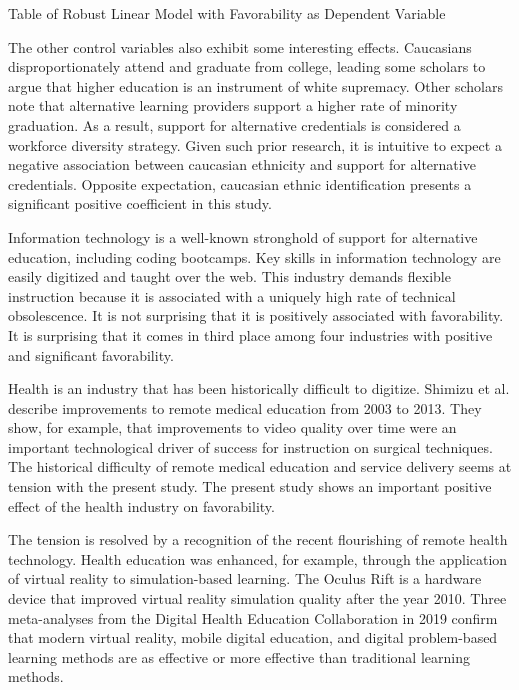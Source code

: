 \begin{table}
    \caption{Table of Robust Linear Model with Favorability as Dependent Variable}
    \resizebox{\columnwidth}{!}{
        
    }
    \tableSpace
    \label{tab:table_robust_reg}
\end{table}

The other control variables also exhibit some interesting effects.
Caucasians disproportionately attend and graduate from college,
leading some scholars to argue that higher education is an instrument of white supremacy\cite{hikido2016whitened, dennis2001skillful}.
Other scholars note that alternative learning providers support a higher rate of minority graduation.
As a result, support for alternative credentials is considered a workforce diversity strategy\cite{brown2017complex, jones2018alternative, rossiter2019designing}.
Given such prior research,
it is intuitive to expect a negative association between caucasian ethnicity and support for alternative credentials.
Opposite expectation, caucasian ethnic identification presents a significant positive coefficient in this study.

Information technology is a well-known stronghold of support for alternative education, including coding bootcamps.
Key skills in information technology are easily digitized and taught over the web.
This industry demands flexible instruction because it is associated with a uniquely high rate of technical obsolescence.
It is not surprising that it is positively associated with favorability.
It is surprising that it comes in third place among four industries with positive and significant favorability.

Health is an industry that has been historically difficult to digitize.
Shimizu et al. describe improvements to remote medical education from 2003 to 2013\cite{shimizu2014ten}.
They show, for example, that improvements to video quality over time were an important technological driver
of success for instruction on surgical techniques.
The historical difficulty of remote medical education and service delivery seems at tension with the present study.
The present study shows an important positive effect of the health industry on favorability.

The tension is resolved by a recognition of the recent flourishing of remote health technology.
Health education was enhanced, for example, through the application of virtual reality to simulation-based learning.
The Oculus Rift is a hardware device that improved virtual reality simulation quality after the year 2010\cite{giuseppe2015new}.
Three meta-analyses from the Digital Health Education Collaboration in 2019 confirm that modern virtual reality,
mobile digital education, and
digital problem-based learning methods are as effective or more effective than traditional learning methods\cite{kyaw2019virtual, dunleavy2019mobile, car2019digital}.

